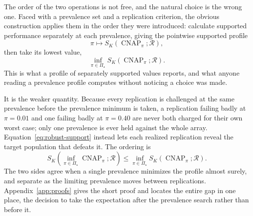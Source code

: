 \documentclass[11pt]{article}
\newcommand{\CNAP}{\operatorname{CNAP}}
\newcommand{\Regime}{\mathcal{R}}
\newcommand{\PSet}{\Pi_\star}
\theoremstyle{remark}
\begin{document}
The order of the two operations is not free, and the natural choice is the wrong one. Faced with a prevalence set and a replication criterion, the obvious construction applies them in the order they were introduced: calculate supported performance separately at each prevalence, giving the pointwise supported profile
\[
\pi
\longmapsto
S_K(\CNAP_\pi;\Regime),
\]
then take its lowest value,
\[
\inf_{\pi\in\PSet}S_K(\CNAP_\pi;\Regime).
\]
This is what a profile of separately supported values reports, and what anyone reading a prevalence profile computes without noticing a choice was made.

It is the weaker quantity. Because every replication is challenged at the same prevalence before the prevalence minimum is taken, a replication failing badly at $\pi=0.01$ and one failing badly at $\pi=0.40$ are never both charged for their own worst case; only one prevalence is ever held against the whole array. Equation~\eqref{eq:robust-support} instead lets each realized replication reveal the target population that defeats it. The ordering is
\begin{equation}
S_K\left(
\inf_{\pi\in\PSet}\CNAP_\pi;
\Regime
\right)
\leq
\inf_{\pi\in\PSet}
S_K(\CNAP_\pi;\Regime).
\label{eq:strong-weak-order}
\end{equation}
The two sides agree when a single prevalence minimizes the profile almost surely, and separate as the limiting prevalence moves between replications. Appendix~\ref{app:proofs} gives the short proof and locates the entire gap in one place, the decision to take the expectation after the prevalence search rather than before it.
\end{document}

